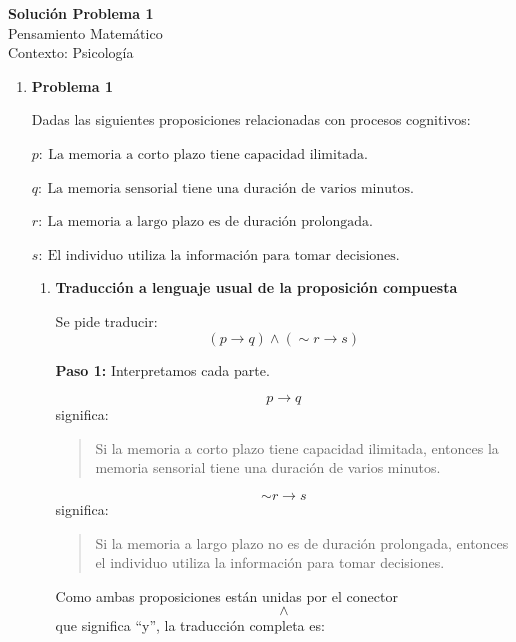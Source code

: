 \documentclass[12pt]{article}
\begin{document}
	
	\begin{center}
		{\Large \textbf{Solución Problema 1}}\\[0.3cm]
		{\normalsize Pensamiento Matemático}\\[0.2cm]
		{\normalsize Contexto: Psicología}
	\end{center}
	
	\vspace{0.4cm}

\begin{enumerate}
	
	\item[] \textbf{Problema 1}
	
	Dadas las siguientes proposiciones relacionadas con procesos cognitivos:
	
	
	\qquad $p:\ \text{La memoria a corto plazo tiene capacidad ilimitada.}$
	
	\qquad $q:\ \text{La memoria sensorial tiene una duración de varios minutos.}$
	
	\qquad $r:\ \text{La memoria a largo plazo es de duración prolongada.}$
	
	\qquad $s:\ \text{El individuo utiliza la información para tomar decisiones.}$
	
	\begin{enumerate}[label=\alph*)]
		
		\item \textbf{Traducción a lenguaje usual de la proposición compuesta}
		
		Se pide traducir:
		\[
		(p \to q)\land (\sim r \to s)
		\]
		
		\textbf{Paso 1:} Interpretamos cada parte.
		
		\[
		p \to q
		\]
		significa:
		
		\begin{quote}
			Si la memoria a corto plazo tiene capacidad ilimitada, entonces la memoria sensorial tiene una duración de varios minutos.
		\end{quote}
		
		\[
		\sim r \to s
		\]
		significa:
		
		\begin{quote}
			Si la memoria a largo plazo no es de duración prolongada, entonces el individuo utiliza la información para tomar decisiones.
		\end{quote}
		
		Como ambas proposiciones están unidas por el conector
		\[
		\land
		\]
		que significa ``y'', la traducción completa es:
		

\end{enumerate}
\end{enumerate}
\end{document}

